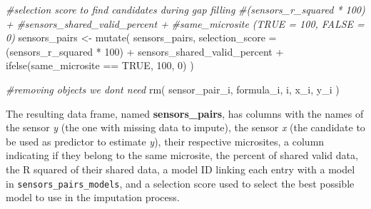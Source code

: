 \documentclass[
  table]{article}
\newenvironment{Shaded}{\begin{snugshade}}{\end{snugshade}}
\newcommand{\AttributeTok}[1]{\textcolor[rgb]{0.77,0.63,0.00}{#1}}
\newcommand{\CommentTok}[1]{\textcolor[rgb]{0.56,0.35,0.01}{\textit{#1}}}
\newcommand{\ConstantTok}[1]{\textcolor[rgb]{0.00,0.00,0.00}{#1}}
\newcommand{\DecValTok}[1]{\textcolor[rgb]{0.00,0.00,0.81}{#1}}
\newcommand{\FunctionTok}[1]{\textcolor[rgb]{0.00,0.00,0.00}{#1}}
\newcommand{\NormalTok}[1]{#1}
\newcommand{\OtherTok}[1]{\textcolor[rgb]{0.56,0.35,0.01}{#1}}
\newcommand{\SpecialCharTok}[1]{\textcolor[rgb]{0.00,0.00,0.00}{#1}}
\begin{document}
\begin{Shaded}
\begin{Highlighting}[]
\CommentTok{\#selection score to find candidates during gap filling }
\CommentTok{\#(sensors\_r\_squared * 100) +}
\CommentTok{\#sensors\_shared\_valid\_percent + }
\CommentTok{\#same\_microsite (TRUE = 100, FALSE = 0)}
\NormalTok{sensors\_pairs }\OtherTok{\textless{}{-}} \FunctionTok{mutate}\NormalTok{(}
\NormalTok{  sensors\_pairs,}
  \AttributeTok{selection\_score =} 
\NormalTok{    (sensors\_r\_squared }\SpecialCharTok{*} \DecValTok{100}\NormalTok{) }\SpecialCharTok{+} 
\NormalTok{    sensors\_shared\_valid\_percent }\SpecialCharTok{+} 
    \FunctionTok{ifelse}\NormalTok{(same\_microsite }\SpecialCharTok{==} \ConstantTok{TRUE}\NormalTok{, }\DecValTok{100}\NormalTok{, }\DecValTok{0}\NormalTok{)}
\NormalTok{)}

\CommentTok{\#removing objects we don\textquotesingle{}t need}
\FunctionTok{rm}\NormalTok{(}
\NormalTok{  sensor\_pair\_i,}
\NormalTok{  formula\_i,}
\NormalTok{  i,}
\NormalTok{  x\_i,}
\NormalTok{  y\_i}
\NormalTok{)}
\end{Highlighting}
\end{Shaded}

The resulting data frame, named \textbf{sensors\_pairs}, has columns
with the names of the sensor \emph{y} (the one with missing data to
impute), the sensor \emph{x} (the candidate to be used as predictor to
estimate \emph{y}), their respective microsites, a column indicating if
they belong to the same microsite, the percent of shared valid data, the
R squared of their shared data, a model ID linking each entry with a
model in \texttt{sensors\_pairs\_models}, and a selection score used to
select the best possible model to use in the imputation process.
\end{document}
